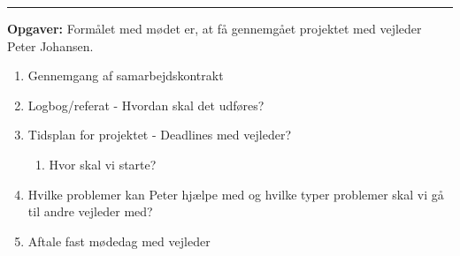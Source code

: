 \hrule
\textbf{Opgaver:} \newline
Formålet med mødet er, at få gennemgået projektet med vejleder Peter Johansen.
\begin{enumerate}
\item Gennemgang af samarbejdskontrakt

\item Logbog/referat - Hvordan skal det udføres?

\item Tidsplan for projektet - Deadlines med vejleder?
\begin{enumerate}
\item Hvor skal vi starte?
\end{enumerate}
\item Hvilke problemer kan Peter hjælpe med og hvilke typer problemer skal vi gå til andre vejleder med?
\item Aftale fast mødedag med vejleder
\end{enumerate}
